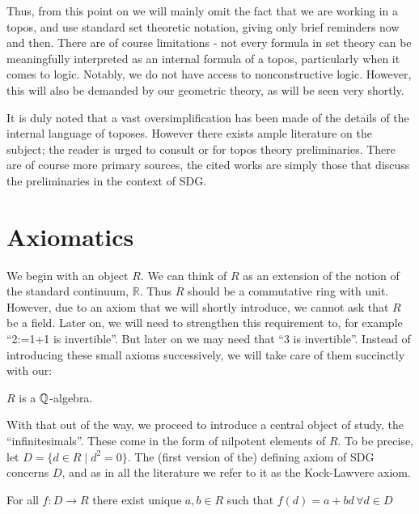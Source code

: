 Thus, from this point on we will mainly omit the fact that we are working in a topos, and use standard set theoretic notation, giving only brief reminders now and then. There are of course limitations - not every formula in set theory can be meaningfully interpreted as an internal formula of a topos, particularly when it comes to logic. Notably, we do not have access to nonconstructive logic. However, this will also be demanded by our geometric theory, as will be seen very shortly. 

It is duly noted that a vast oversimplification has been made of the details of the internal language of toposes. However there exists ample literature on the subject; the reader is urged to consult \cite{bun17} or \cite{kock06} for topos theory preliminaries. There are of course more primary sources, the cited works are simply those that discuss the preliminaries in the context of SDG.

\section{Axiomatics}

We begin with an object \( R \). We can think of \( R \) as an extension of the notion of the standard continuum, \( \mathbb{R} \). Thus \( R \) should be a commutative ring with unit. However, due to an axiom that we will shortly introduce, we cannot ask that \( R \) be a field. Later on, we will need to strengthen this requirement to, for example ``2:=1+1 is invertible''. But later on we may need that ``3 is invertible''. Instead of introducing these small axioms successively, we will take care of them succinctly with our:

\begin{axiom}
  \label{ax0}
  \( R \) is a \( \mathbb{Q} \)-algebra.
\end{axiom}

With that out of the way, we proceed to introduce a central object of study, the ``infinitesimals''. These come in the form of nilpotent elements of \( R \). To be precise, let \( D = \{d\in R \mid d^2=0\} \). The (first version of the) defining axiom of SDG concerns \( D \), and as in all the literature we refer to it as the Kock-Lawvere axiom.

\begin{klaxiom}
  \label{KL1}
  For all \( f:D\to R \) there exist unique \( a,b\in R \) such that \( f(d) = a + bd\,\forall d\in D \)
\end{klaxiom}


